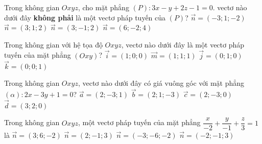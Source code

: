 \begin{ex}%
	Trong không gian $O x y z$, cho mặt phẳng $(P)\colon 3 x-y+2 z-1=0$. vectơ nào dưới đây \textbf{không phải} là một vectơ pháp tuyến của $(P)$?
	\choice
	{$\overrightarrow{n}=(-3; 1;-2)$}
	{\True $\overrightarrow{n}=(3; 1; 2)$}
	{$\overrightarrow{n}=(3;-1; 2)$}
	{$\overrightarrow{n}=(6;-2; 4)$}
\end{ex}

\begin{ex}%
	Trong không gian với hệ tọa độ $O x y z$, vectơ nào dưới đây là một vectơ pháp tuyến của mặt phẳng $(O x y)$?
	\choice
	{$\overrightarrow{i}=(1; 0; 0)$}
	{$\overrightarrow{m}=(1; 1; 1)$}
	{$\overrightarrow{j}=(0; 1; 0)$}
	{\True $\overrightarrow{k}=(0; 0; 1)$}
\end{ex}

\begin{ex}%
	Trong không gian $O x y z$, vectơ nào dưới đây có giá vuông góc với mặt phẳng $(\alpha)\colon 2 x-3 y+1=0$?
	\choice
	{$\overrightarrow{a}=(2;-3; 1)$}
	{$\overrightarrow{b}=(2; 1;-3)$}
	{\True $\overrightarrow{c}=(2;-3; 0)$}
	{$\overrightarrow{d}=(3; 2; 0)$}
\end{ex}

\begin{ex}%
	Trong không gian $O x y z$, một vectơ pháp tuyến của mặt phẳng $\dfrac{x}{-2}+\dfrac{y}{-1}+\dfrac{z}{3}=1$ là
	\choice
	{\True $\overrightarrow{n}=(3; 6;-2)$}
	{$\overrightarrow{n}=(2;-1; 3)$}
	{$\overrightarrow{n}=(-3;-6;-2)$}
	{$\overrightarrow{n}=(-2;-1; 3)$}
\end{ex}

